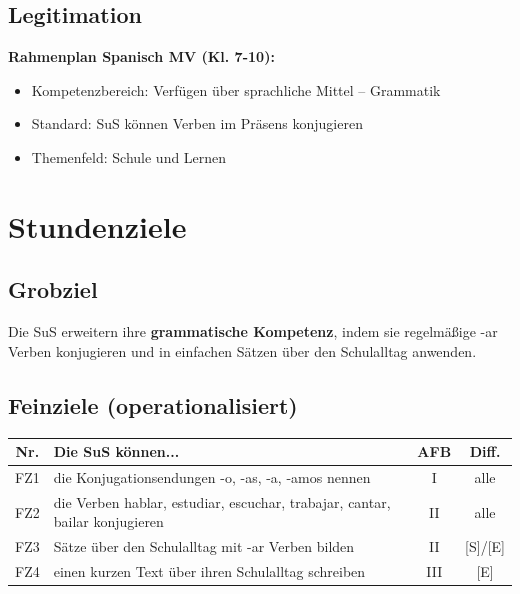 \documentclass[11pt,a4paper]{article}
\begin{document}
\subsection{Legitimation}
\textbf{Rahmenplan Spanisch MV (Kl. 7-10):}
\begin{itemize}
    \item Kompetenzbereich: Verfügen über sprachliche Mittel -- Grammatik
    \item Standard: SuS können Verben im Präsens konjugieren
    \item Themenfeld: Schule und Lernen
\end{itemize}

\section{Stundenziele}

\subsection{Grobziel}
Die SuS erweitern ihre \textbf{grammatische Kompetenz}, indem sie regelmäßige -ar Verben konjugieren und in einfachen Sätzen über den Schulalltag anwenden.

\subsection{Feinziele (operationalisiert)}
\begin{tabular}{|c|p{8cm}|c|c|}
\hline
\textbf{Nr.} & \textbf{Die SuS können...} & \textbf{AFB} & \textbf{Diff.} \\
\hline
FZ1 & die Konjugationsendungen -o, -as, -a, -amos nennen & I & alle \\
\hline
FZ2 & die Verben hablar, estudiar, escuchar, trabajar, cantar, bailar konjugieren & II & alle \\
\hline
FZ3 & Sätze über den Schulalltag mit -ar Verben bilden & II & [S]/[E] \\
\hline
FZ4 & einen kurzen Text über ihren Schulalltag schreiben & III & [E] \\
\hline
\end{tabular}

\end{document}
